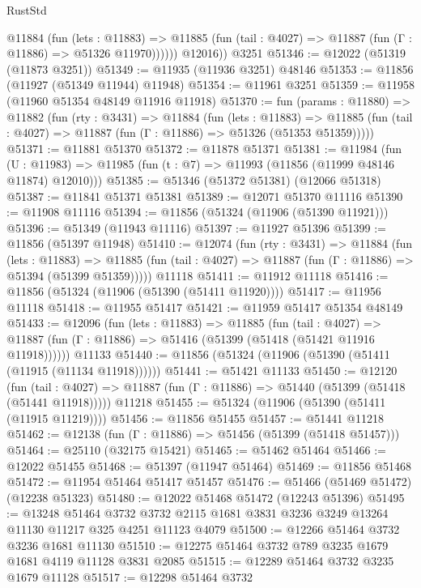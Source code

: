 \begin{lexlean}{RustStd}
\begin{coremodule}
            @11884
              (fun (lets : @11883) =>
              @11885 (fun (tail : @4027) => @11887 (fun (Γ : @11886) => @51326 @11970))))))
        @12016))
    @3251
@51346 := @12022 (@51319 (@11873 @3251))
@51349 := @11935 (@11936 @3251) @48146
@51353 := @11856 (@11927 (@51349 @11944) @11948)
@51354 := @11961 @3251
@51359 := @11958 (@11960 @51354 @48149 @11916 @11918)
@51370 := fun (params : @11880) =>
  @11882
    (fun (rty : @3431) =>
    @11884
      (fun (lets : @11883) =>
      @11885 (fun (tail : @4027) => @11887 (fun (Γ : @11886) => @51326 (@51353 @51359)))))
@51371 := @11881 @51370
@51372 := @11878 @51371
@51381 := @11984
    (fun (U : @11983) => @11985 (fun (t : @7) => @11993 (@11856 (@11999 @48146 @11874) @12010)))
@51385 := @51346 (@51372 @51381) (@12066 @51318)
@51387 := @11841 @51371 @51381
@51389 := @12071 @51370 @11116
@51390 := @11908 @11116
@51394 := @11856 (@51324 (@11906 (@51390 @11921)))
@51396 := @51349 (@11943 @11116)
@51397 := @11927 @51396
@51399 := @11856 (@51397 @11948)
@51410 := @12074
    (fun (rty : @3431) =>
    @11884
      (fun (lets : @11883) =>
      @11885 (fun (tail : @4027) => @11887 (fun (Γ : @11886) => @51394 (@51399 @51359)))))
    @11118
@51411 := @11912 @11118
@51416 := @11856 (@51324 (@11906 (@51390 (@51411 @11920))))
@51417 := @11956 @11118
@51418 := @11955 @51417
@51421 := @11959 @51417 @51354 @48149
@51433 := @12096
    (fun (lets : @11883) =>
    @11885
      (fun (tail : @4027) =>
      @11887 (fun (Γ : @11886) => @51416 (@51399 (@51418 (@51421 @11916 @11918))))))
    @11133
@51440 := @11856 (@51324 (@11906 (@51390 (@51411 (@11915 (@11134 @11918))))))
@51441 := @51421 @11133
@51450 := @12120
    (fun (tail : @4027) => @11887 (fun (Γ : @11886) => @51440 (@51399 (@51418 (@51441 @11918)))))
    @11218
@51455 := @51324 (@11906 (@51390 (@51411 (@11915 @11219))))
@51456 := @11856 @51455
@51457 := @51441 @11218
@51462 := @12138 (fun (Γ : @11886) => @51456 (@51399 (@51418 @51457)))
@51464 := @25110 (@32175 @15421)
@51465 := @51462 @51464
@51466 := @12022 @51455
@51468 := @51397 (@11947 @51464)
@51469 := @11856 @51468
@51472 := @11954 @51464 @51417 @51457
@51476 := @51466 (@51469 @51472) (@12238 @51323)
@51480 := @12022 @51468 @51472 (@12243 @51396)
@51495 := @13248
    @51464
    @3732
    @3732
    @2115
    @1681
    @3831
    @3236
    @3249
    @13264
    @11130
    @11217
    @325
    @4251
    @11123
    @4079
@51500 := @12266 @51464 @3732 @3236 @1681 @11130
@51510 := @12275 @51464 @3732 @789 @3235 @1679 @1681 @4119 @11128 @3831 @2085
@51515 := @12289 @51464 @3732 @3235 @1679 @11128
@51517 := @12298 @51464 @3732

\end{coremodule}
\end{lexlean}
